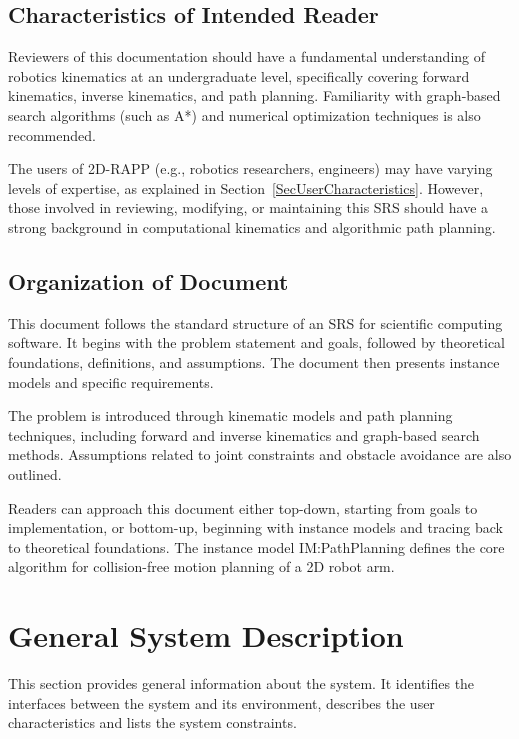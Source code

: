 \documentclass[12pt]{article}
\begin{document}
\subsection{Characteristics of Intended Reader} \label{sec_IntendedReader}
Reviewers of this documentation should have a fundamental understanding of robotics kinematics at an undergraduate level, specifically covering forward kinematics, inverse kinematics, and path planning. Familiarity with graph-based search algorithms (such as A*) and numerical optimization techniques is also recommended.

The users of 2D-RAPP (e.g., robotics researchers, engineers) may have varying levels of expertise, as explained in Section~\ref{SecUserCharacteristics}. However, those involved in reviewing, modifying, or maintaining this SRS should have a strong background in computational kinematics and algorithmic path planning.


\subsection{Organization of Document}

This document follows the standard structure of an SRS for scientific computing software. It begins with the problem statement and goals, followed by theoretical foundations, definitions, and assumptions. The document then presents instance models and specific requirements.

The problem is introduced through kinematic models and path planning techniques, including forward and inverse kinematics and graph-based search methods. Assumptions related to joint constraints and obstacle avoidance are also outlined.

Readers can approach this document either top-down, starting from goals to implementation, or bottom-up, beginning with instance models and tracing back to theoretical foundations. The instance model IM:PathPlanning defines the core algorithm for collision-free motion planning of a 2D robot arm.


\section{General System Description}

This section provides general information about the system.  It identifies the
interfaces between the system and its environment, describes the user
characteristics and lists the system constraints. 
\end{document}
